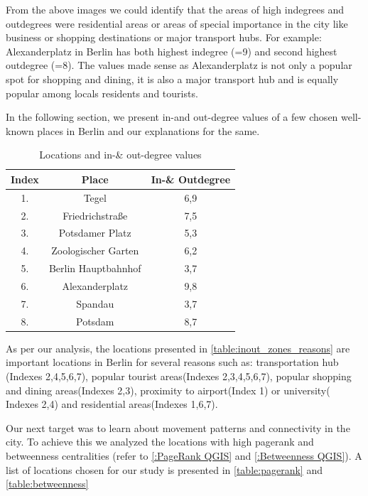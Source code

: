 From the above images we could identify that the areas of high indegrees and outdegrees were residential areas or areas of special importance in the city like business or shopping destinations or major transport hubs. For example: Alexanderplatz in Berlin has both highest indegree (=9) and second highest outdegree (=8). The values made sense as Alexanderplatz is not only a popular spot for shopping and dining, it is also a major transport hub and is equally popular among locals residents and tourists.

In the following section, we present in-and out-degree values of a few chosen well-known places in Berlin and our explanations for the same.

\begin{table}[ht]
	\caption{Locations and in-\& out-degree values}
	\centering
	\begin{tabular}{c c c}
		\hline
		Index &Place & In-\& Outdegree \\[0.1ex]
		\hline
		1. & Tegel  & 6,9 \\		
		2. & Friedrichstraße & 7,5 \\
		3. & Potsdamer Platz & 5,3 \\			
		4. & Zoologischer Garten & 6,2 \\
		5. & Berlin Hauptbahnhof & 3,7 \\	
		6. & Alexanderplatz & 9,8 \\
		7. & Spandau & 3,7 \\
		8. & Potsdam & 8,7 \\ [1ex]				
		\hline
	\end{tabular}
	\label{table:inout_zones_reasons}
\end{table}

As per our analysis, the locations presented in \autoref{table:inout_zones_reasons} are important locations in Berlin for several reasons such as: transportation hub (Indexes 2,4,5,6,7), popular tourist areas(Indexes 2,3,4,5,6,7), popular shopping and dining areas(Indexes 2,3), proximity to airport(Index 1) or university( Indexes 2,4) and residential areas(Indexes 1,6,7).

Our next target was to learn about movement patterns and connectivity in the city. To achieve this we analyzed the locations with high pagerank and betweenness centralities (refer to \autoref{:PageRank QGIS} and \autoref{:Betweenness QGIS}). A list of locations chosen for our study is presented in \autoref{table:pagerank} and \autoref{table:betweenness}


